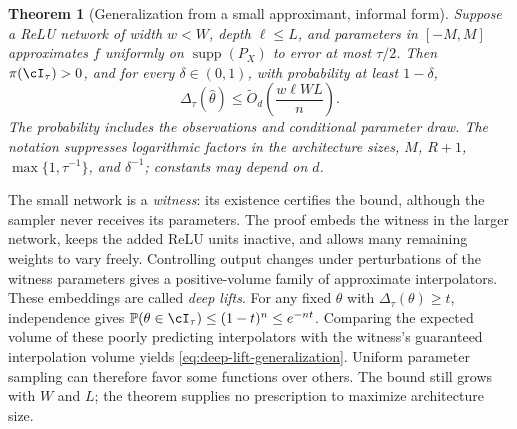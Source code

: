 \documentclass[11pt,twoside]{article}
\renewcommand{\P}{\mathbb P}
\newtheorem{theorem}{Theorem}[section]
\theoremstyle{definition}
\theoremstyle{remark}
\begin{document}
\begin{theorem}[Generalization from a small approximant, informal form]
\label{thm:deep-lift-generalization}
Suppose a ReLU network of width $w<W$, depth $\ell\leq L$, and parameters
in $[-M,M]$ approximates $f$ uniformly on $\operatorname{supp}(P_X)$ to
error at most $\tau/2$. Then $\pi(\cI_\tau)>0$, and for every
$\delta\in(0,1)$, with probability at least $1-\delta$,
\begin{equation}
 \Delta_\tau(\widehat\theta)
 \leq\widetilde O_d\!\left(\frac{w\ell WL}{n}\right).
 \label{eq:deep-lift-generalization}
\end{equation}
The probability includes the observations and conditional parameter draw.
The notation suppresses logarithmic factors in the architecture sizes,
$M$, $R+1$, $\max\{1,\tau^{-1}\}$, and $\delta^{-1}$; constants may depend
on $d$.
\end{theorem}

The small network is a \emph{witness}: its existence certifies the bound,
although the sampler never receives its parameters. The proof embeds the
witness in the larger network, keeps the added ReLU units inactive, and
allows many remaining weights to vary freely. Controlling output changes
under perturbations of the witness parameters gives a positive-volume
family of approximate interpolators. These embeddings are called
\emph{deep lifts}. For any fixed $\theta$ with
$\Delta_\tau(\theta)\geq t$, independence gives
$\P(\theta\in\cI_\tau)\leq(1-t)^n\leq e^{-nt}$.
Comparing the expected volume of these poorly predicting interpolators with
the witness's guaranteed interpolation volume yields
\cref{eq:deep-lift-generalization}. Uniform parameter sampling can therefore
favor some functions over others. The bound still grows with $W$ and $L$;
the theorem supplies no prescription to maximize architecture size.
\end{document}
